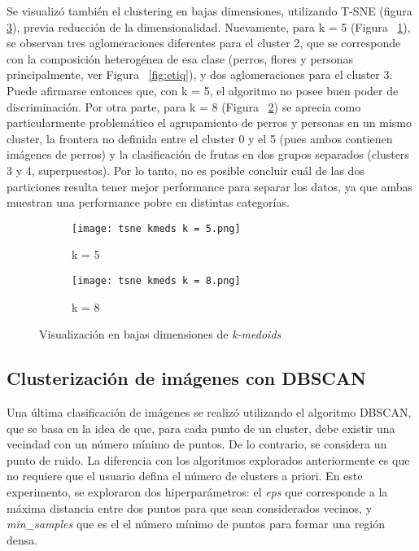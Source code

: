\documentclass[journal,article,submit,pdftex,moreauthors]{Definitions/mdpi}
\begin{document}
Se visualizó también el clustering en bajas dimensiones, utilizando T-SNE (figura \ref{tsne-kmeds}), previa reducción de la dimensionalidad. Nuevamente, para k = 5 (Figura ~\ref{fig:tsne-kmeds-5}), se observan tres aglomeraciones diferentes para el cluster 2, que se corresponde con la composición heterogénea de esa clase (perros, flores y personas principalmente, ver Figura ~\ref{fig:etiq}), y dos aglomeraciones para el cluster 3. Puede afirmarse entonces que, con k = 5, el algoritmo no posee buen poder de discriminación. Por otra parte, para k = 8 (Figura ~\ref{fig:tsne-8-kmed}) se aprecia como particularmente problemático el agrupamiento de perros y personas en un mismo cluster, la frontera no definida entre el cluster 0 y el 5 (pues ambos contienen imágenes de perros) y la clasificación de frutas en dos grupos separados (clusters 3 y 4, superpuestos). Por lo tanto, no es posible concluir cuál de las dos particiones resulta tener mejor performance para separar los datos, ya que ambas muestran una performance pobre en distintas categorías. 

\begin{figure}[h]

\begin{subfigure}{0.5\textwidth}
\texttt{[image: tsne kmeds k = 5.png]} 
\captionsetup{justification=centering}
\caption{k = 5}
\label{fig:tsne-kmeds-5}
\end{subfigure}
\begin{subfigure}{0.5\textwidth}
\texttt{[image: tsne kmeds k = 8.png]}
\captionsetup{justification=centering}
\caption{k = 8}
\label{fig:tsne-8-kmed}
\end{subfigure}
\captionsetup{justification=centering}
\caption{Visualización en bajas dimensiones de \textit{k-medoids}}
\label{tsne-kmeds}
\end{figure}

\subsection{Clusterización de imágenes con DBSCAN}

Una última clasificación de imágenes se realizó utilizando el algoritmo DBSCAN, que se basa en la idea de que, para cada punto de un cluster, debe existir una vecindad con un número mínimo de puntos. De lo contrario, se considera un punto de ruido. La diferencia con los algoritmos explorados anteriormente es que no requiere que el usuario defina el número de clusters a priori. En este experimento, se exploraron dos hiperparámetros: el \textit{eps} que corresponde a la máxima distancia entre dos puntos para que sean considerados vecinos, y \textit{min\_samples} que es el el número mínimo de puntos para formar una región densa. 
\end{document}
